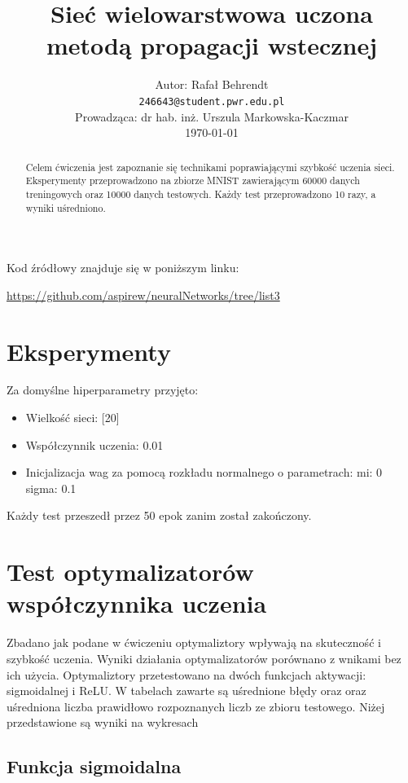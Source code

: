 \documentclass{article}
\title{ Sieć wielowarstwowa uczona metodą propagacji wstecznej  }
\author{
  Autor: Rafał Behrendt \\
  \texttt{246643@student.pwr.edu.pl} \\
  Prowadząca: dr hab. inż. Urszula Markowska-Kaczmar \\
  \today
}
\begin{document}
\maketitle

\begin{abstract}
  Celem ćwiczenia jest zapoznanie się technikami poprawiającymi szybkość uczenia sieci. Eksperymenty przeprowadzono na zbiorze
  MNIST zawierającym 60000 danych treningowych oraz 10000 danych testowych. Każdy test przeprowadzono 10 razy, a wyniki uśredniono.
\end{abstract}

Kod źródłowy znajduje się w poniższym linku:

\begin{center}
  \url{https://github.com/aspirew/neuralNetworks/tree/list3}
\end{center}

\newpage
\section{Eksperymenty}

Za domyślne hiperparametry przyjęto:

\begin{itemize}
  \item Wielkość sieci: [20]
  \item Współczynnik uczenia: 0.01
  \item Inicjalizacja wag za pomocą rozkładu normalnego o parametrach:
  \subitem mi: 0
  \subitem sigma: 0.1
\end{itemize}

Każdy test przeszedł przez 50 epok zanim został zakończony.

\section{Test optymalizatorów współczynnika uczenia}

Zbadano jak podane w ćwiczeniu optymaliztory wpływają na skuteczność i szybkość uczenia. Wyniki działania optymalizatorów porównano
z wnikami bez ich użycia. Optymaliztory przetestowano na dwóch funkcjach aktywacji: sigmoidalnej i ReLU. W
tabelach zawarte są uśrednione błędy oraz oraz uśredniona liczba prawidłowo rozpoznanych liczb ze
zbioru testowego. Niżej przedstawione są wyniki na wykresach

\subsection{Funkcja sigmoidalna}
\end{document}
